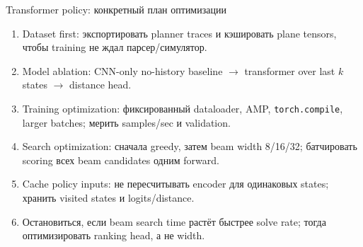 \documentclass[aspectratio=169]{beamer}
\begin{document}
\begin{frame}{Transformer policy: конкретный план оптимизации}
  \small
  \begin{enumerate}
    \item Dataset first: экспортировать planner traces и кэшировать plane tensors, чтобы training не ждал парсер/симулятор.
    \item Model ablation: CNN-only no-history baseline \(\rightarrow\) transformer over last \(k\) states \(\rightarrow\) distance head.
    \item Training optimization: фиксированный dataloader, AMP, \texttt{torch.compile}, larger batches; мерить samples/sec и validation.
    \item Search optimization: сначала greedy, затем beam width 8/16/32; батчировать scoring всех beam candidates одним forward.
    \item Cache policy inputs: не пересчитывать encoder для одинаковых states; хранить visited states и logits/distance.
    \item Остановиться, если beam search time растёт быстрее solve rate; тогда оптимизировать ranking head, а не width.
  \end{enumerate}
\end{frame}
\end{document}
